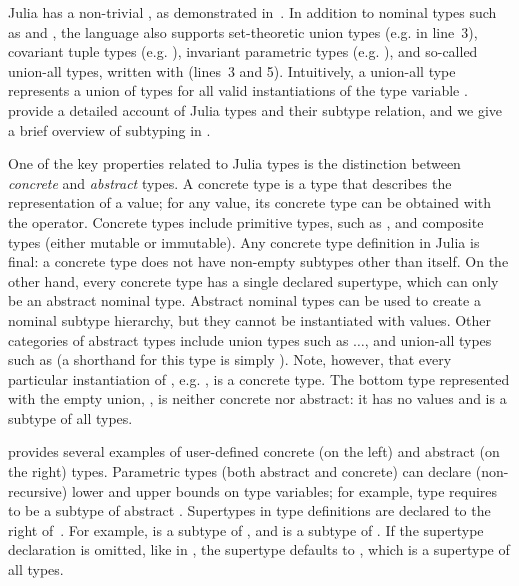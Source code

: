 Julia has a non-trivial , as
demonstrated in~. In addition to nominal types such
as  and , the language also supports set-theoretic union
types (e.g.  in line~3),
covariant tuple types (e.g. ),
invariant parametric types (e.g. ),
and so-called union-all types, written with  (lines~3 and 5).
Intuitively, a union-all type  represents a union of types
 for all valid instantiations  of the type variable .
\citet{oopsla18b} provide a detailed
account of Julia types and their subtype relation, and we give a brief
overview of subtyping in .

One of the key properties related to Julia types is the distinction between
\emph{concrete} and \emph{abstract} types. A concrete type is a type that
describes the representation of a value; for any value, its concrete type can be
obtained with the  operator. Concrete types include primitive types,
such as , and composite  types (either mutable or
immutable). Any concrete type definition in Julia is final: a concrete type does
not have non-empty subtypes other than itself.
On the other hand, every concrete type has a single
declared supertype, which can only be an abstract nominal type.
Abstract nominal types can be used
to create a nominal subtype hierarchy, but they cannot be instantiated with
values. Other categories of abstract types include union types
such as $\ldots$, and union-all types
such as  (a shorthand for this type 
is simply ). Note, however, that every particular instantiation of
, e.g. , is a concrete type.
The bottom type represented with the empty union, , is neither
concrete nor abstract: it has no values and is a subtype of all types.

 provides several examples of user-defined
concrete (on the left) and abstract (on the right) types. Parametric types (both
abstract and concrete) can declare (non-recursive) lower and upper bounds on type variables;
for example, type  requires  to be a subtype of
abstract .
Supertypes in type definitions are declared to the right of~\cjl{<:}.
For example,  is a subtype of , and  is a
subtype of . If the supertype declaration is omitted, like in
, the supertype defaults to ,
which is a supertype of all types.

